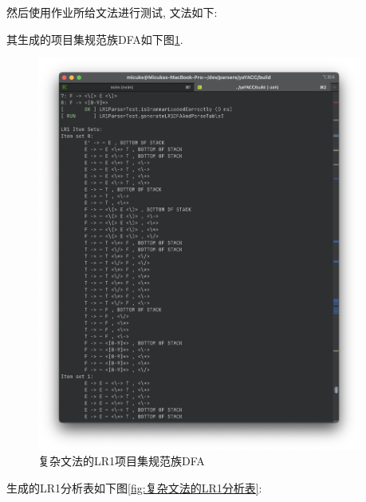然后使用作业所给文法进行测试, 文法如下:


其生成的项目集规范族DFA如下图\ref{fig:复杂文法的LR1项目集规范族DFA}.

\begin{figure}[ht!]
	\begin{center}
		\includegraphics[width=0.95\textwidth]{figures/lr1规范族1.png}
	\end{center}
	\caption{复杂文法的LR1项目集规范族DFA}
	\label{fig:复杂文法的LR1项目集规范族DFA}
\end{figure}

生成的LR1分析表如下图\ref{fig:复杂文法的LR1分析表}:

